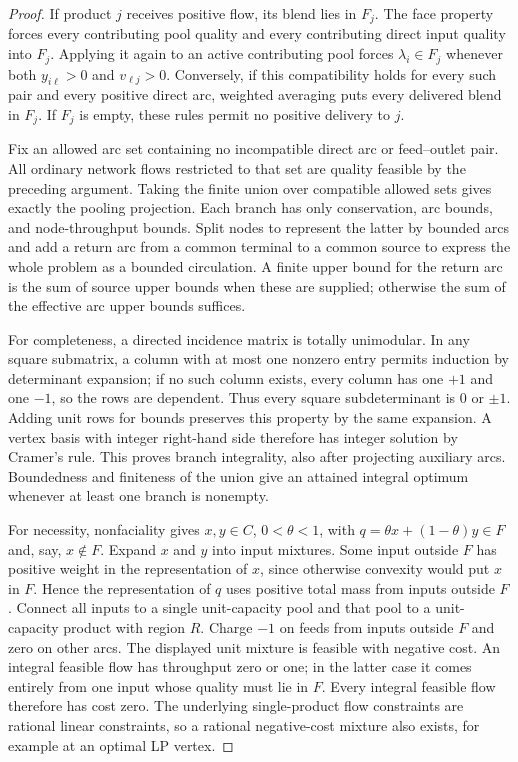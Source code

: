 \begin{proof}
If product $j$ receives positive flow, its blend lies in $F_j$.
The face property forces every contributing pool quality and every
contributing direct input quality into $F_j$. Applying it again to
an active contributing pool forces $\lambda_i\in F_j$ whenever both
$y_{i\ell}>0$ and $v_{\ell j}>0$. Conversely, if this compatibility
holds for every such pair and every positive direct arc, weighted
averaging puts every delivered blend in $F_j$. If $F_j$ is empty,
these rules permit no positive delivery to $j$.

Fix an allowed arc set containing no incompatible direct arc or feed--outlet
pair. All ordinary network flows restricted to that set are quality
feasible by the preceding argument. Taking the finite union over
compatible allowed sets gives exactly the pooling projection. Each
branch has only conservation, arc bounds, and node-throughput bounds.
Split nodes to represent the latter by bounded arcs and add a return
arc from a common terminal to a common source to express the whole
problem as a bounded circulation. A finite upper bound for the return
arc is the sum of source upper bounds when these are supplied; otherwise
the sum of the effective arc upper bounds suffices.

For completeness, a directed incidence matrix is totally unimodular.
In any square submatrix, a column with at most one nonzero entry permits
induction by determinant expansion; if no such column exists, every
column has one $+1$ and one $-1$, so the rows are dependent. Thus every
square subdeterminant is $0$ or $\pm1$. Adding unit rows for bounds
preserves this property by the same expansion. A vertex basis with
integer right-hand side therefore has integer solution by Cramer's rule.
This proves branch integrality, also after projecting auxiliary arcs.
Boundedness and finiteness of the union give an attained integral optimum
whenever at least one branch is nonempty.

For necessity, nonfaciality gives $x,y\in C$, $0<\theta<1$, with
$q=\theta x+(1-\theta)y\in F$ and, say, $x\notin F$. Expand $x$ and
$y$ into input mixtures. Some input outside $F$ has positive weight
in the representation of $x$, since otherwise convexity would put $x$
in $F$. Hence the representation of $q$ uses positive total mass from
inputs outside $F$. Connect all inputs to a single unit-capacity pool
and that pool to a unit-capacity product with region $R$. Charge $-1$
on feeds from inputs outside $F$ and zero on other arcs. The displayed
unit mixture is feasible with negative cost. An integral feasible flow
has throughput zero or one; in the latter case it comes entirely from
one input whose quality must lie in $F$. Every integral feasible flow
therefore has cost zero. The underlying single-product flow constraints
are rational linear constraints, so a rational negative-cost mixture
also exists, for example at an optimal LP vertex.
\end{proof}

